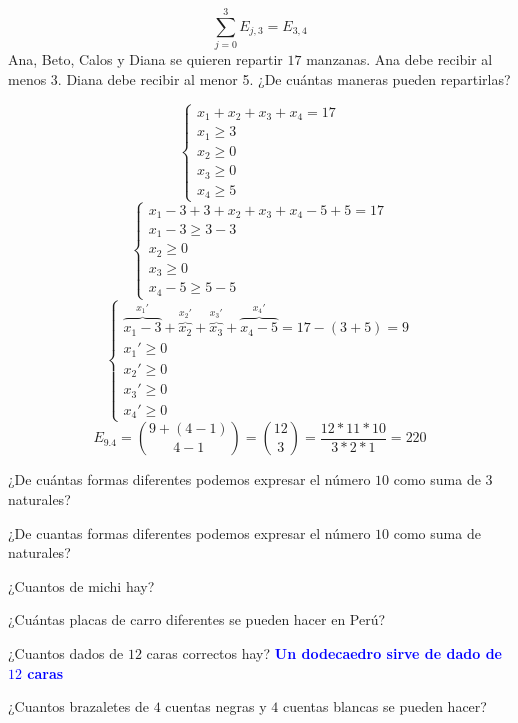 \documentclass[../main.tex]{subfiles}
\begin{document}
\[
	\sum^3_{j=0}E_{j,3}=E_{3,4}
\]
Ana, Beto, Calos y Diana se quieren repartir $17$ manzanas.
Ana debe recibir al menos $3$.
Diana debe recibir al menor 5.
¿De cuántas maneras pueden repartirlas?

\[
	\begin{cases}
		x_1+x_2+x_3+x_4=17\\
		x_1\geq3\\
		x_2\geq0\\
		x_3\geq0\\
		x_4\geq5
	\end{cases}
\]
\[
	\begin{cases}
		x_1-3+3+x_2+x_3+x_4-5+5=17\\
		x_1-3\geq3-3\\
		x_2\geq0\\
		x_3\geq0\\
		x_4-5\geq5-5
	\end{cases}
\]
\[
	\begin{cases}
		\overbrace{x_1-3}^{x_1'}
		+\overbrace{x_2}^{x_2'}
		+\overbrace{x_3}^{x_3'}
		+\overbrace{x_4-5}^{x_4'}
		=17-(3+5)=9
		\\
		x_1'\geq0\\
		x_2'\geq0\\
		x_3'\geq0\\
		x_4'\geq0
	\end{cases}
\]
\[
	E_{9.4}
	=\binom{9+(4-1)}{4-1}
	=\binom{12}{3}
	= \frac{12*11*10}{3*2*1}
	= 220
\]

¿De cuántas formas diferentes podemos expresar el número $10$ como suma de $3$ naturales?

¿De cuantas formas diferentes podemos expresar el número $10$
como suma de naturales?

¿Cuantos  de michi hay?

¿Cuántas placas de carro diferentes se pueden hacer en Perú?


¿Cuantos dados de $12$ caras correctos hay?
\textcolor{blue}{ \textbf{Un dodecaedro sirve de dado de $12$ caras}}

¿Cuantos brazaletes de $4$ cuentas negras y $4$ cuentas blancas se pueden hacer?
\end{document}
